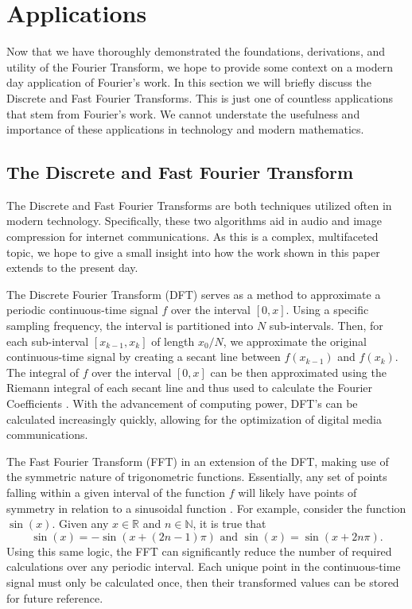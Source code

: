 \documentclass[11pt]{amsart}
\theoremstyle{plain}
\theoremstyle{definition}
\newcommand{\N}{\mathbb N}
\newcommand{\R}{\mathbb R}
\begin{document}
\section{Applications}
Now that we have thoroughly demonstrated the foundations, derivations, and utility of the Fourier Transform, we hope to provide some context on a modern day application of Fourier's work. In this section we will briefly discuss the Discrete and Fast Fourier Transforms. This is just one of countless applications that stem from Fourier's work. We cannot understate the usefulness and importance of these applications in technology and modern mathematics. 

\subsection{The Discrete and Fast Fourier Transform}
The Discrete and Fast Fourier Transforms are both techniques utilized often in modern technology. Specifically, these two algorithms aid in audio and image compression for internet communications. As this is a complex, multifaceted topic, we hope to give a small insight into how the work shown in this paper extends to the present day.

The Discrete Fourier Transform (DFT) serves as a method to approximate a periodic continuous-time signal $f$ over the interval $[0,x]$. Using a specific sampling frequency, the interval is partitioned into $N$ sub-intervals. Then, for each sub-interval $[x_{k-1},x_k]$ of length $x_0/N$, we approximate the original continuous-time signal by creating a secant line between $f(x_{k-1})$ and $f(x_k)$. The integral of $f$ over the interval $[0,x]$ can be then approximated using the Riemann integral of each secant line and thus used to calculate the Fourier Coefficients \cite{FFT}. With the advancement of computing power, DFT's can be calculated increasingly quickly, allowing for the optimization of digital media communications. 

The Fast Fourier Transform (FFT) in an extension of the DFT, making use of the symmetric nature of trigonometric functions. Essentially, any set of points falling within a given interval of the function $f$ will likely have points of symmetry in relation to a sinusoidal function \cite{Gauss}. For example, consider the function $\sin(x)$. Given any $x\in\R$ and $n\in\N$, it is true that $$\sin(x) = -\sin(x+(2n-1)\pi)\text{ and } \sin(x) = \sin(x+2n\pi).$$ Using this same logic, the FFT can significantly reduce the number of required calculations over any periodic interval. Each unique point in the continuous-time signal must only be calculated once, then their transformed values can be stored for future reference.
\end{document}
